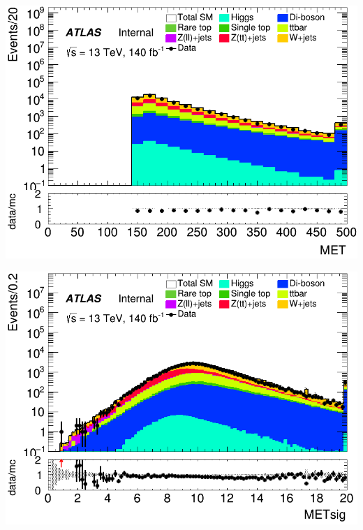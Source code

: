 \documentclass[usenames,dvipsnames]{beamer}
\begin{document}
\begin{frame}
    \vspace{0.5cm} %

    \begin{minipage}{0.32\textwidth}
        \centering
        \includegraphics[width=\textwidth]{graphics/LH_met/LH_met_MET.png}
    \end{minipage}
    \hfill
    \begin{minipage}{0.32\textwidth}
        \centering
        \includegraphics[width=\textwidth]{graphics/LH_met/LH_met_METsig.png}
    \end{minipage}
    \hfill
    

\end{frame}
\end{document}
